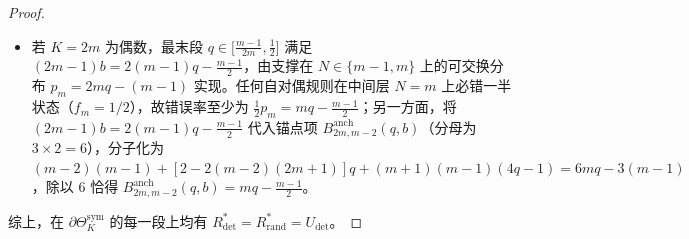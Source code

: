 \documentclass[11pt,a4paper]{article}
\theoremstyle{definition}
\theoremstyle{remark}
\newcommand{\Rdet}{R^*_{\mathrm{det}}}
\newcommand{\Rrand}{R^*_{\mathrm{rand}}}
\newcommand{\Thetasym}{\Theta^{\mathrm{sym}}_K}
\begin{document}
\begin{proof}
\begin{enumerate}
\begin{itemize}
    \item 若 $K = 2m$ 为偶数，最末段 $q \in \bigl[\frac{m-1}{2m}, \frac{1}{2}\bigr]$ 满足 $(2m-1)b = 2(m-1)q - \frac{m-1}{2}$，由支撑在 $N \in \{m-1, m\}$ 上的可交换分布 $p_m = 2mq - (m-1)$ 实现。任何自对偶规则在中间层 $N=m$ 上必错一半状态（$f_m = 1/2$），故错误率至少为 $\frac{1}{2}p_m = mq - \frac{m-1}{2}$；另一方面，将 $(2m-1)b = 2(m-1)q - \frac{m-1}{2}$ 代入锚点项 $B^{\mathrm{anch}}_{2m, m-2}(q, b)$（分母为 $3 \times 2 = 6$），分子化为 $(m-2)(m-1) + [2 - 2(m-2)(2m+1)]q + (m+1)(m-1)(4q - 1) = 6mq - 3(m-1)$，除以 $6$ 恰得 $B^{\mathrm{anch}}_{2m, m-2}(q, b) = mq - \frac{m-1}{2}$。
  \end{itemize}
\end{enumerate}
综上，在 $\partial\Thetasym$ 的每一段上均有 $\Rdet = \Rrand = U_{\mathrm{det}}$。
\end{proof}
\end{document}
